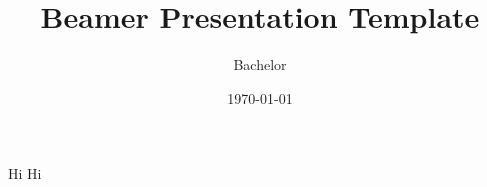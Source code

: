 \documentclass[10pt,a4paper]{article}
\title{Beamer Presentation Template}
\author{Bachelor}
\date{\today}
\begin{document}
Hi
\pagebreak
Hi
\end{document}
